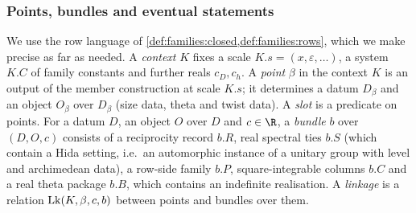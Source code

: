 \subsubsection{Points, bundles and eventual statements}
We use the row language of \cref{def:families:closed,def:families:rows}, which we make precise as far as needed.
A \emph{context} $K$ fixes a scale $K.s=(x,\varepsilon,\dots)$, a system $K.C$ of family constants and further reals
$c_D,c_h$. A \emph{point} $\beta$ in the context $K$ is an output of the member construction at scale $K.s$; it
determines a datum $D_\beta$ and an object $O_\beta$ over $D_\beta$ (size data, theta and twist data). A \emph{slot}
is a predicate on points. For a datum $D$, an object $O$ over $D$ and $c\in\R$, a \emph{bundle} $b$ over $(D,O,c)$
consists of a reciprocity record $b.R$, real spectral ties $b.S$ (which contain a Hida setting, i.e.\ an automorphic
instance of a unitary group with level and archimedean data), a row-side family $b.P$, square-integrable columns
$b.C$ and a real theta package $b.B$, which contains an indefinite realisation. A \emph{linkage} is a relation
$\mathrm{Lk}(K,\beta,c,b)$ between points and bundles over them.

